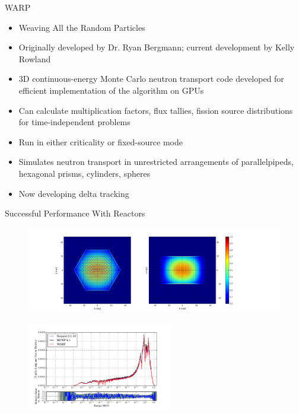 \documentclass[xcolor=x11names,compress]{beamer}
\renewcommand{\(}{\begin{columns}}
\renewcommand{\)}{\end{columns}}
\newcommand{\<}[1]{\begin{column}{#1}}
\renewcommand{\>}{\end{column}}
\begin{document}
\begin{frame}{WARP \cite{warp}}
	\begin{itemize}
	\item{Weaving All the Random Particles}
	\item{Originally developed by Dr. Ryan Bergmann; current development by Kelly Rowland}
	\item{3D continuous-energy Monte Carlo neutron transport code developed
	     for efficient implementation of the algorithm on GPUs}
	\item{Can calculate multiplication factors, flux tallies, fission source
	     distributions for time-independent problems}
	\item{Run in either criticality or fixed-source mode}
	\item{Simulates neutron transport in unrestricted arrangements of parallelpipeds,
	     hexagonal prisms, cylinders, spheres}
	\item{Now developing delta tracking \cite{woodcock}}
	\end{itemize}
\end{frame}

\begin{frame}{Successful Performance With Reactors}
 
    \begin{center}
 	\begin{figure}     
 	\includegraphics[height=1.5in,clip]{../figs/assembly-fiss-6}
 	\end{figure}
 	\end{center}   
 	
 	\begin{center}
 	\begin{figure}     
 	\includegraphics[height=1.5in,clip]{../figs/assembly-spec-6}
 	\end{figure}
 	\end{center} 
 
\end{frame}
\end{document}
